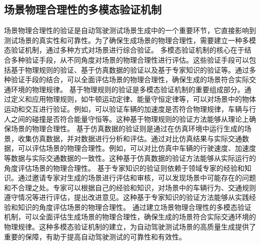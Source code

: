 \subsection{场景物理合理性的多模态验证机制}
场景物理合理性的验证是自动驾驶测试场景生成中的一个重要环节，它直接影响到测试场景的真实性和可靠性。为了确保生成场景的物理合理性，需要建立一种多模态验证机制，通过多种方式对场景进行综合验证。
多模态验证机制的核心在于结合多种验证手段，从不同角度对场景的物理合理性进行评估。这些验证手段可以包括基于物理规则的验证、基于仿真数据的验证以及基于专家知识的验证等。通过多种验证手段的结合，可以全面评估场景的物理合理性，确保生成的场景符合实际交通环境的物理规律。
基于物理规则的验证是多模态验证机制的重要组成部分。通过定义和应用物理规则，如牛顿运动定律、能量守恒定律等，可以对场景中的物体运动和交互进行验证。例如，可以验证车辆的加速度是否符合物理规律，车辆与行人之间的碰撞是否符合能量守恒等。这种基于物理规则的验证方法能够从理论上确保场景的物理合理性。
基于仿真数据的验证则是通过在仿真环境中运行生成的场景，收集仿真数据，并对数据进行分析和评估。通过对比仿真结果与实际交通数据，可以评估场景的物理合理性。例如，可以对比仿真中车辆的行驶速度、加速度等数据与实际交通数据的一致性。这种基于仿真数据的验证方法能够从实际运行的角度评估场景的物理合理性。
基于专家知识的验证则依赖于领域专家的经验和知识。通过邀请专家对生成的场景进行评估和审核，可以发现场景中可能存在的问题和不合理之处。专家可以根据自己的经验和知识，对场景中的车辆行为、交通规则遵守情况等进行评估，提出改进意见。这种基于专家知识的验证方法能够从实践经验和知识的角度评估场景的物理合理性。
通过建立场景物理合理性的多模态验证机制，可以全面评估生成场景的物理合理性，确保生成的场景符合实际交通环境的物理规律。这种多模态验证机制的建立，为自动驾驶测试场景的高质量生成提供了重要的保障，有助于提高自动驾驶测试的可靠性和有效性。
